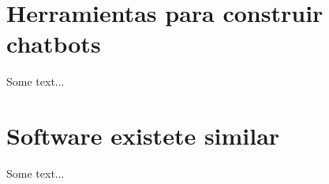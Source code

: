 \section{Herramientas para construir chatbots}
Some text...

\section{Software existete similar}
Some text... 
